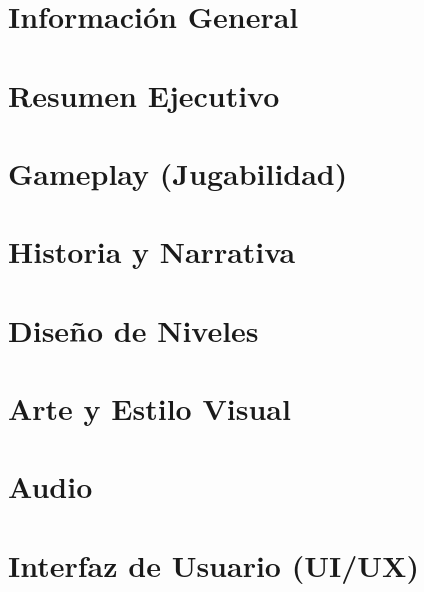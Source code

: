 \documentclass[a4paper,12pt]{article}
\begin{document}


\tableofcontents
\newpage

\section{Información General}

\newpage

\section{Resumen Ejecutivo}

\newpage

\section{Gameplay (Jugabilidad)}



\newpage

\section{Historia y Narrativa}



\newpage

\section{Diseño de Niveles}



\newpage

\section{Arte y Estilo Visual}



\newpage

\section{Audio}



\newpage

\section{Interfaz de Usuario (UI/UX)}



\newpage
\end{document}

